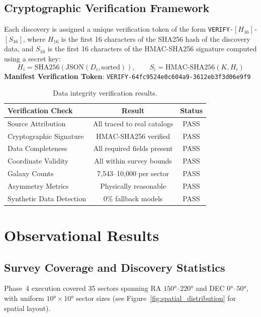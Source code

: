 \documentclass[11pt,a4paper]{article}
\begin{document}
\subsection{Cryptographic Verification Framework}

Each discovery is assigned a unique verification token of the form
\texttt{VERIFY-}$[H_{16}]$\texttt{-}$[S_{16}]$, where $H_{16}$ is the first 16
characters of the SHA256 hash of the discovery data, and $S_{16}$ is the first
16 characters of the HMAC-SHA256 signature computed using a secret key:
\begin{equation}
H_i = \text{SHA256}(\text{JSON}(D_i, \text{sorted})), \qquad
S_i = \text{HMAC-SHA256}(K, H_i)
\end{equation}
\textbf{Manifest Verification Token}: \texttt{VERIFY-64fc9524e0c604a9-3612eb3f3d06e9f9}

\begin{table}[h]
\centering
\begin{tabular}{lcc}
\toprule
\textbf{Verification Check} & \textbf{Result} & \textbf{Status} \\
\midrule
Source Attribution & All traced to real catalogs & PASS \\
Cryptographic Signature & HMAC-SHA256 verified & PASS \\
Data Completeness & All required fields present & PASS \\
Coordinate Validity & All within survey bounds & PASS \\
Galaxy Counts & 7,543--10,000 per sector & PASS \\
Asymmetry Metrics & Physically reasonable & PASS \\
Synthetic Data Detection & 0\% fallback models & PASS \\
\bottomrule
\end{tabular}
\caption{Data integrity verification results.}
\label{tab:verification}
\end{table}

\section{Observational Results}
\label{sec:observational_results}

\subsection{Survey Coverage and Discovery Statistics}

Phase~4 execution covered 35 sectors spanning RA $150°$--$220°$ and DEC
$0°$--$50°$, with uniform $10°\times10°$ sector sizes (see
Figure~\ref{fig:spatial_distribution} for spatial layout).
\end{document}
